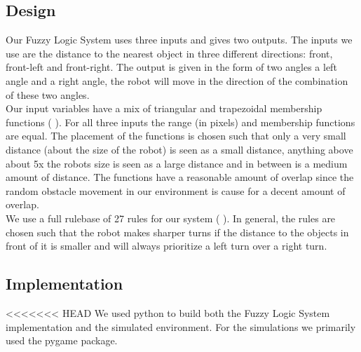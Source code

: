 \documentclass[conference]{IEEEtran}
\begin{document}
\subsection{Design}
Our Fuzzy Logic System uses three inputs and gives two outputs. The inputs we use are the distance to the nearest object in three different directions: front, front-left and front-right. The output is given in the form of two angles a left angle and a right angle, the robot will move in the direction of the combination of these two angles.\\
Our input variables have a mix of triangular and trapezoidal membership functions (
). For all three inputs the range (in pixels) and membership functions are equal. The placement of the functions is chosen such that only a very small distance (about the size of the robot) is seen as a small distance, anything above about 5x the robots size is seen as a large distance and in between is a medium amount of distance. The functions have a reasonable amount of overlap since the random obstacle movement in our environment is cause for a decent amount of overlap.\\
We use a full rulebase of 27 rules for our system (
). In general, the rules are chosen such that the robot makes sharper turns if the distance to the objects in front of it is smaller and will always prioritize a left turn over a right turn.\\

\subsection{Implementation}
<<<<<<< HEAD
We used python to build both the Fuzzy Logic System implementation and the simulated environment. For the simulations we primarily used the pygame package.\\
\end{document}

